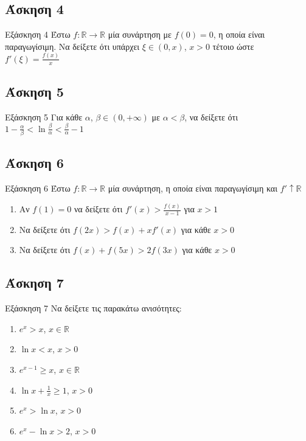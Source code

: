 \documentclass[greek]{beamer}
\begin{document}
\subsection{Άσκηση 4}
\begin{frame}[label=Άσκηση4]{Εξάσκηση 4}
 Έστω $f:\mathbb{R}\to\mathbb{R}$ μία συνάρτηση με $f(0)=0$, η οποία είναι παραγωγίσιμη. Να δείξετε ότι υπάρχει $ξ\in (0,x)$, $x>0$ τέτοιο ώστε $f'(ξ)=\frac{f(x)}{x}$

\end{frame}

\subsection{Άσκηση 5}
\begin{frame}[label=Άσκηση5]{Εξάσκηση 5}
 Για κάθε $α$, $β\in (0,+\infty)$ με $α<β$, να δείξετε ότι $1-\frac{α}{β}<\ln \frac{β}{α}<\frac{β}{α}-1$

\end{frame}

\subsection{Άσκηση 6}
\begin{frame}[label=Άσκηση6]{Εξάσκηση 6}
 Έστω $f:\mathbb{R}\to\mathbb{R}$ μία συνάρτηση, η οποία είναι παραγωγίσιμη και $f'\uparrow \mathbb{R}$
 \begin{enumerate}
  \item<1-> Αν $f(1)=0$ να δείξετε ότι $f'(x)>\frac{f(x)}{x-1}$ για $x>1$
  \item<2-> Να δείξετε ότι $f(2x)>f(x)+xf'(x)$ για κάθε $x>0$
  \item<3-> Να δείξετε ότι $f(x)+f(5x)>2f(3x)$ για κάθε $x>0$
 \end{enumerate}

\end{frame}

\subsection{Άσκηση 7}
\begin{frame}[label=Άσκηση7]{Εξάσκηση 7}
 Να δείξετε τις παρακάτω ανισότητες:
 \begin{enumerate}
  \item<1-> $e^x> x$, $x\in\mathbb{R}$
  \item<2-> $\ln x<x$, $x>0$
  \item<3-> $e^{x-1}\ge x$, $x\in\mathbb{R}$
  \item<4-> $\ln x+\frac{1}{x}\ge 1$, $x>0$
  \item<5-> $e^x>\ln x$, $x>0$
  \item<6-> $e^x-\ln x>2$, $x>0$
 \end{enumerate}

\end{frame}
\end{document}
